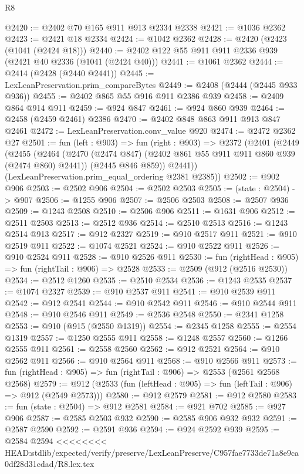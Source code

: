 \begin{lexlean}{R8}
\begin{coremodule}
{{{{{{{{{{{{{{{{{{{{{{{{{{{{{{{{{{{{{{{{{{{{{@2420 := @2402 @70 @165 @911 @913 @2334 @2338
@2421 := @1036 @2362
@2423 := @2421 @18 @2334
@2424 := @1042 @2362
@2428 := @2420 (@2423 (@1041 (@2424 @18)))
@2440 := @2402 @122 @55 @911 @911 @2336 @939 (@2421 @40 @2336 (@1041 (@2424 @40)))
@2441 := @1061 @2362
@2444 := @2414 (@2428 (@2440 @2441))
@2445 := LexLeanPreservation.prim_compareBytes
@2449 := @2408 (@2444 (@2445 @933 @936))
@2455 := @2402 @865 @55 @916 @911 @2386 @939
@2458 := @2409 @864 @914 @911
@2459 := @924 @847
@2461 := @924 @860 @939
@2464 := @2458 (@2459 @2461) @2386
@2470 := @2402 @848 @863 @911 @913 @847 @2461
@2472 := LexLeanPreservation.conv_value @920
@2474 := @2472 @2362 @27
@2501 := fun (left : @903) =>
  fun (right : @903) =>
  @2372
    (@2401
      (@2449
        (@2455
          (@2464
            (@2470 (@2474 @847) (@2402 @861 @55 @911 @911 @860 @939 (@2474 @860) @2441))
            (@2445 @846 @859))
          @2441))
      (LexLeanPreservation.prim_equal_ordering @2381 @2385))
@2502 := @902 @906
@2503 := @2502 @906
@2504 := @2502 @2503
@2505 := (state : @2504) -> @907
@2506 := @1255 @906
@2507 := @2506 @2503
@2508 := @2507 @936
@2509 := @1243 @2508
@2510 := @2506 @906
@2511 := @1631 @906
@2512 := @2511 @2503
@2513 := @2512 @936
@2514 := @2510 @2513
@2516 := @1243 @2514 @913
@2517 := @912 @2327
@2519 := @910 @2517 @911
@2521 := @910 @2519 @911
@2522 := @1074 @2521
@2524 := @910 @2522 @911
@2526 := @910 @2524 @911
@2528 := @910 @2526 @911
@2530 := fun (rightHead : @905) => fun (rightTail : @906) => @2528
@2533 := @2509 (@912 (@2516 @2530))
@2534 := @2512 @1260
@2535 := @2510 @2534
@2536 := @1243 @2535
@2537 := @1074 @2327
@2539 := @910 @2537 @911
@2541 := @910 @2539 @911
@2542 := @912 @2541
@2544 := @910 @2542 @911
@2546 := @910 @2544 @911
@2548 := @910 @2546 @911
@2549 := @2536 @2548
@2550 := @2341 @1258
@2553 := @910 (@915 (@2550 @1319))
@2554 := @2345 @1258
@2555 := @2554 @1319
@2557 := @1250 @2555 @911
@2558 := @1248 @2557
@2560 := @1266 @2555 @911
@2561 := @2558 @2560
@2562 := @912 @2521
@2564 := @910 @2562 @911
@2566 := @910 @2564 @911
@2568 := @910 @2566 @911
@2573 := fun (rightHead : @905) => fun (rightTail : @906) => @2553 (@2561 @2568 @2568)
@2579 := @912 (@2533 (fun (leftHead : @905) => fun (leftTail : @906) => @912 (@2549 @2573)))
@2580 := @912 @2579
@2581 := @912 @2580
@2583 := fun (state : @2504) => @912 @2581
@2584 := @921 @702
@2585 := @927 @906
@2587 := @2585 @2503 @932
@2590 := @2585 @906 @932 @932
@2591 := @2587 @2590
@2592 := @2591 @936
@2594 := @924 @2592 @939
@2595 := @2584 @2594
<<<<<<<< HEAD:stdlib/expected/verify/preserve/LexLeanPreserve/C957fae7733de71a8e9ca0df28d31cdad/R8.lex.tex
}}}}}}}}}}}}}}}}}}}}}}}}}}}}}}}}}}}}}}}}}}}}}
\end{coremodule}
\end{lexlean}
